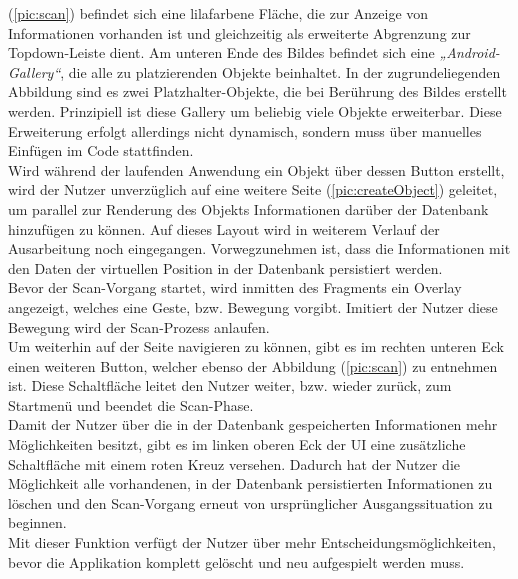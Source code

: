 (\ref{pic:scan}) befindet sich eine lilafarbene Fläche, die zur Anzeige von Informationen vorhanden ist und gleichzeitig als erweiterte Abgrenzung 
zur Topdown-Leiste dient. Am unteren Ende des Bildes befindet sich eine \textit{„Android-Gallery“}, die alle zu platzierenden Objekte beinhaltet. In 
der zugrundeliegenden Abbildung sind es zwei Platzhalter-Objekte, die bei Berührung des Bildes erstellt werden. Prinzipiell ist diese Gallery um 
beliebig viele Objekte erweiterbar. Diese Erweiterung erfolgt allerdings nicht dynamisch, sondern muss über manuelles Einfügen im Code stattfinden. 
\\
Wird während der laufenden Anwendung ein Objekt über dessen Button erstellt, wird der Nutzer unverzüglich auf eine weitere Seite (\ref{pic:createObject}) 
geleitet, um parallel zur Renderung des Objekts Informationen darüber der Datenbank hinzufügen zu können. Auf dieses Layout wird in weiterem Verlauf der 
Ausarbeitung noch eingegangen. Vorwegzunehmen ist, dass die Informationen mit den Daten der virtuellen Position in der Datenbank persistiert werden.
\\ 
\linebreak 
Bevor der Scan-Vorgang startet, wird inmitten des Fragments ein Overlay angezeigt, welches eine Geste, bzw. Bewegung vorgibt. Imitiert der Nutzer 
diese Bewegung wird der Scan-Prozess anlaufen.
\\ 
\linebreak
Um weiterhin auf der Seite navigieren zu können, gibt es im rechten unteren Eck einen weiteren Button, welcher ebenso der Abbildung (\ref{pic:scan}) 
zu entnehmen ist. Diese Schaltfläche leitet den Nutzer weiter, bzw. wieder zurück, zum Startmenü und beendet die Scan-Phase. 
\\ 
\linebreak
Damit der Nutzer über die in der Datenbank gespeicherten Informationen mehr Möglichkeiten besitzt, gibt es im linken oberen Eck der \acs{UI} eine zusätzliche 
Schaltfläche mit einem roten Kreuz versehen. Dadurch hat der Nutzer die Möglichkeit alle vorhandenen, in der Datenbank persistierten Informationen zu 
löschen und den Scan-Vorgang erneut von ursprünglicher Ausgangssituation zu beginnen.  
\\ 
Mit dieser Funktion verfügt der Nutzer über mehr Entscheidungsmöglichkeiten, bevor die Applikation komplett gelöscht und neu aufgespielt werden muss.
